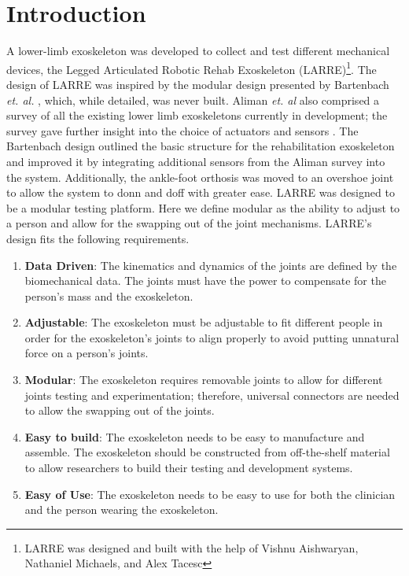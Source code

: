 \section{Introduction}
A lower-limb exoskeleton was developed to collect and test different mechanical devices, the Legged Articulated Robotic Rehab Exoskeleton (LARRE)\footnote{LARRE was designed and built with the help of Vishnu Aishwaryan, Nathaniel Michaels, and Alex Tacesc}.  The design of LARRE was inspired by the modular design presented by Bartenbach \textit{et. al.} \cite{7523699}, which, while detailed, was never built. Aliman \textit{et. al} also comprised a survey of all the existing lower limb exoskeletons currently in development; the survey gave further insight into the choice of actuators and sensors \cite{aliman2017design}. The Bartenbach design outlined the basic structure for the rehabilitation exoskeleton and improved it by integrating additional sensors from the Aliman survey into the system. Additionally, the ankle-foot orthosis was moved to an overshoe joint to allow the system to donn and doff with greater ease.
LARRE was designed to be a modular testing platform. Here we define modular as the ability to adjust to a person and allow for the swapping out of the joint mechanisms. LARRE's design fits the following requirements. 


\begin{enumerate}[noitemsep]
\item \textbf{Data Driven}: The kinematics and dynamics of the joints are defined by the biomechanical data. The joints must have the power to compensate for the person's mass and the exoskeleton. 
\item \textbf{Adjustable}: The exoskeleton must be adjustable to fit different people in order for the exoskeleton's joints to align properly to avoid putting unnatural force on a person's joints. 
\item \textbf{Modular}: The exoskeleton requires removable joints to allow for different joints testing and experimentation; therefore, universal connectors are needed to allow the swapping out of the joints. 
\item \textbf{Easy to build}: The exoskeleton needs to be easy to manufacture and assemble. The exoskeleton should be constructed from off-the-shelf material to allow researchers to build their testing and development systems. 
\item \textbf{Easy of Use}: The exoskeleton needs to be easy to use for both the clinician and the person wearing the exoskeleton. 
\end{enumerate}

